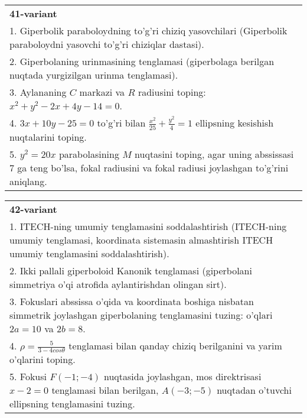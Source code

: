 \documentclass{article}
\begin{document}
\begin{tabular}{m{17cm}}
\textbf{41-variant}\\
1. Giperbolik paraboloydning to'g'ri chiziq yasovchilari (Giperbolik paraboloydni yasovchi to'g'ri chiziqlar dastasi).\\

2. Giperbolaning urinmasining tenglamasi (giperbolaga berilgan nuqtada yurgizilgan urinma tenglamasi).\\

3. Aylananing $C$ markazi va $R$ radiusini toping: $x^2+y^2-2x+4y-14=0$.\\

4. $3x + 10y - 25 = 0$ to'g'ri bilan $\frac{x^{2}}{25} + \frac{y^{2}}{4} = 1$ ellipsning kesishish nuqtalarini toping.  \\

5. $y^{2} = 20x$ parabolasining $M$ nuqtasini toping, agar uning abssissasi 7 ga teng bo'lsa, fokal radiusini va fokal radiusi joylashgan to'g'rini aniqlang.
\end{tabular}
\vspace{1cm}


\begin{tabular}{m{17cm}}
\textbf{42-variant}\\
1. ITECH-ning umumiy tenglamasini soddalashtirish (ITECH-ning umumiy tenglamasi, koordinata sistemasin almashtirish ITECH umumiy tenglamasini soddalashtirish).\\

2. Ikki pallali giperboloid Kanonik tenglamasi (giperbolani simmetriya o'qi atrofida aylantirishdan olingan sirt).\\

3. Fokuslari abssissa o'qida va koordinata boshiga nisbatan simmetrik joylashgan giperbolaning tenglamasini tuzing: o'qlari $2a=10$ va $2b=8$.\\

4. $\rho = \frac{5}{3 - 4cos\theta}$ tenglamasi bilan qanday chiziq berilganini va yarim o'qlarini toping.  \\

5. Fokusi $F( - 1; - 4)$ nuqtasida joylashgan, mos direktrisasi $x - 2 = 0$ tenglamasi bilan berilgan, $A( - 3; - 5)$ nuqtadan o'tuvchi ellipsning tenglamasini tuzing.  
\end{tabular}
\vspace{1cm}
\end{document}
